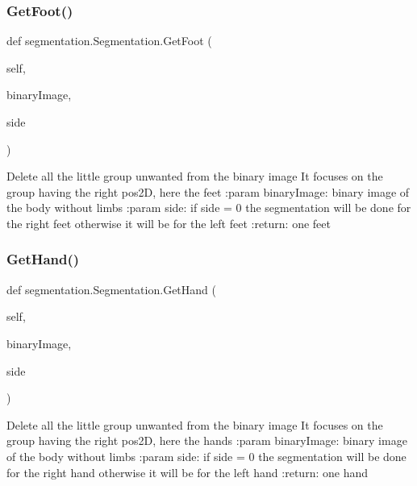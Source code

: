 \subsubsection{Get\+Foot()}
{\footnotesize\ttfamily def segmentation.\+Segmentation.\+Get\+Foot (\begin{DoxyParamCaption}\item[{}]{self,  }\item[{}]{binary\+Image,  }\item[{}]{side }\end{DoxyParamCaption})}

\begin{DoxyVerb}Delete all the little group unwanted from the binary image
It focuses on the group having the right pos2D, here the feet
:param binaryImage: binary image of the body without limbs
:param side: if side = 0 the segmentation will be done for the right feet
  otherwise it will be for the left feet
:return: one feet
\end{DoxyVerb}
 \mbox{\label{classsegmentation_1_1_segmentation_ac40379d03b4adb8c368d7d7d12e0d321}} 
\subsubsection{Get\+Hand()}
{\footnotesize\ttfamily def segmentation.\+Segmentation.\+Get\+Hand (\begin{DoxyParamCaption}\item[{}]{self,  }\item[{}]{binary\+Image,  }\item[{}]{side }\end{DoxyParamCaption})}

\begin{DoxyVerb}Delete all the little group unwanted from the binary image
It focuses on the group having the right pos2D, here the hands
:param binaryImage: binary image of the body without limbs
:param side: if side = 0 the segmentation will be done for the right hand
  otherwise it will be for the left hand
:return: one hand
\end{DoxyVerb}
 \mbox{\label{classsegmentation_1_1_segmentation_a57bb91652be301652103fa04944fced9}} 
